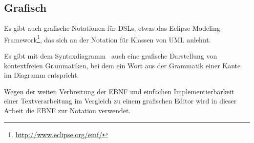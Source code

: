 \documentclass[../InterneDSLs.tex]{subfiles}
\begin{document}
\subsection{Grafisch}
Es gibt auch grafische Notationen für DSLs, etwas das Eclipse Modeling Framework\footnote{\url{http://www.eclipse.org/emf/}}, das sich an der Notation für Klassen von UML anlehnt.

Es gibt mit dem Syntaxdiagramm~\cite{syntaxdiagram.wikipedia} auch eine grafische Darstellung von kontextfreien Grammatiken, bei dem ein Wort aus der Grammatik einer Kante im Diagramm entspricht.

Wegen der weiten Verbreitung der EBNF und einfachen Implementierbarkeit einer Textverarbeitung im Vergleich zu einem grafischen Editor wird in dieser Arbeit die EBNF zur Notation verwendet.
\end{document}

